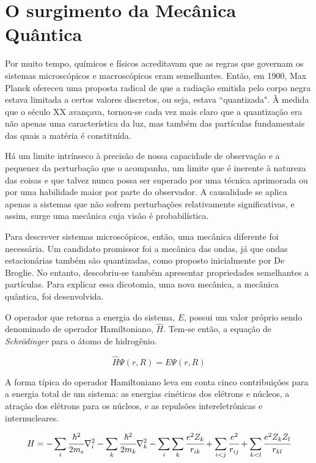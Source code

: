 \section{O surgimento da Mecânica Quântica}

Por muito tempo, químicos e físicos acreditavam que as regras que governam os sistemas microscópicos e macroscópicos eram semelhantes. Então, em 1900, Max Planck ofereceu uma proposta radical de que a radiação emitida pelo corpo negra estava limitada a certos valores discretos, ou seja, estava ``quantizada". À medida que o século XX avançava, tornou-se cada vez mais claro que a quantização era não apenas uma característica da luz, mas também das partículas fundamentais das quais a matéria é constituída.  \cite{Cramer2004}

Há um limite intrínseco à precisão de nossa capacidade de observação e a pequenez da perturbação que o acompanha, um limite que é inerente à natureza das coisas e que talvez nunca possa ser superado por uma técnica aprimorada ou por uma habilidade maior por parte do observador. A causalidade se aplica apenas a sistemas que não sofrem perturbações relativamente significativas, e assim, surge uma mecânica cuja visão é probabilística. \cite{Dirac1958}

Para descrever sistemas microscópicos, então, uma mecânica diferente foi necessária.
Um candidato promissor foi a mecânica das ondas, já que ondas estacionárias também são quantizadas, como proposto inicialmente por De Broglie. No entanto, descobriu-se também apresentar propriedades semelhantes a partículas. Para explicar essa dicotomia, uma nova mecânica, a mecânica quântica, foi desenvolvida. \cite{Cramer2004}

O operador que retorna a energia do sistema, $E$, possui um valor próprio sendo denominado de
operador Hamiltoniano, $\hat{H}$. Tem-se então, a equação de \textit{Schr\"{o}dinger} para o átomo de hidrogênio. \cite{Cramer2004}

\begin{equation}
    \hat{H} \Psi(r, R) = E \Psi(r, R)
\end{equation}

A forma típica do operador Hamiltoniano leva em conta cinco contribuições para a energia total de um sistema:
as energias cinéticas dos elétrons e núcleos, a atração dos elétrons para os núcleos, e as repulsões intereletrônicas e internucleares. \cite{Cramer2004}

\begin{equation}
    H = - \sum_{i} \cfrac{\hbar^2}{2m_e} \nabla_i^2 - \sum_{k} \cfrac{\hbar^2}{2m_k} \nabla_k^2 - \sum_i\sum_k \cfrac{e^2 Z_k}{r_{ik}} + \sum_{i < j} \cfrac{e^2}{r_{ij}} + \sum_{k < l} \cfrac{e^2 Z_k Z_l}{r_{kl}}
\end{equation}

